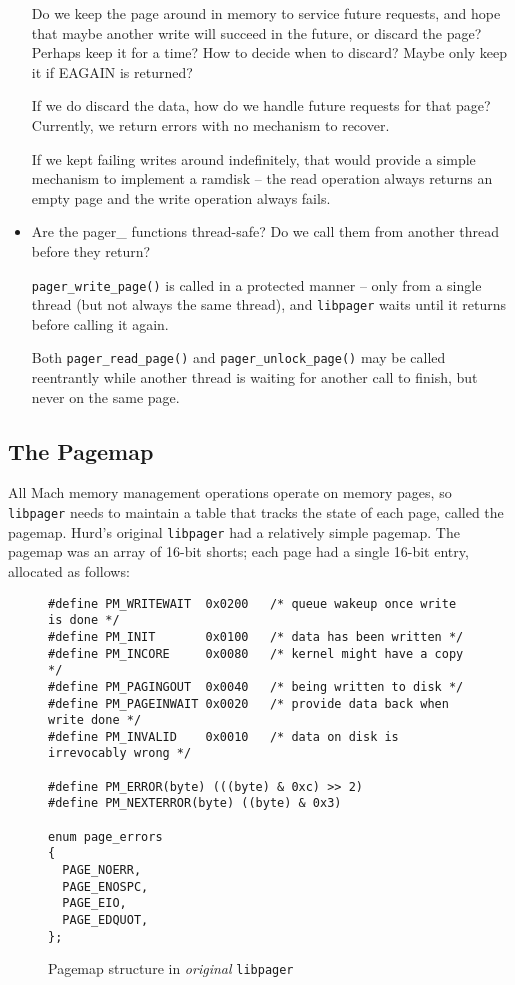 \documentclass{article}
\def\libpager{{\tt libpager}\xspace}
\begin{document}
\begin{itemize}
  Do we keep the page around in memory to service future requests, and
  hope that maybe another write will succeed in the future, or discard
  the page?  Perhaps keep it for a time?  How to decide when to
  discard?  Maybe only keep it if EAGAIN is returned?

  If we do discard the data, how do we handle future requests for that
  page?  Currently, we return errors with no mechanism to recover.

  If we kept failing writes around indefinitely, that would provide a
  simple mechanism to implement a ramdisk -- the read operation always
  returns an empty page and the write operation always fails.

\item Are the pager_ functions thread-safe?  Do we call them from
  another thread before they return?

  {\tt pager_write_page()} is called in a protected manner -- only
  from a single thread (but not always the same thread), and \libpager
  waits until it returns before calling it again.

  Both {\tt pager_read_page()} and {\tt pager_unlock_page()} may be
  called reentrantly while another thread is waiting for another call
  to finish, but never on the same page.

\end{itemize}


\subsection{The Pagemap}

All Mach memory management operations operate on memory pages, so
\libpager needs to maintain a table that tracks the state of each
page, called the pagemap.  Hurd's original \libpager had a relatively
simple pagemap.  The pagemap was an array of 16-bit shorts; each page
had a single 16-bit entry, allocated as follows:

\begin{figure}[h]
\begin{mdframed}[backgroundcolor=lightblue]
\begin{verbatim}
#define PM_WRITEWAIT  0x0200   /* queue wakeup once write is done */
#define PM_INIT       0x0100   /* data has been written */
#define PM_INCORE     0x0080   /* kernel might have a copy */
#define PM_PAGINGOUT  0x0040   /* being written to disk */
#define PM_PAGEINWAIT 0x0020   /* provide data back when write done */
#define PM_INVALID    0x0010   /* data on disk is irrevocably wrong */

#define PM_ERROR(byte) (((byte) & 0xc) >> 2)
#define PM_NEXTERROR(byte) ((byte) & 0x3)

enum page_errors
{
  PAGE_NOERR,
  PAGE_ENOSPC,
  PAGE_EIO,
  PAGE_EDQUOT,
};
\end{verbatim}
\end{mdframed}
\caption{Pagemap structure in {\it original} {\tt libpager}}
\end{figure}
\end{document}
